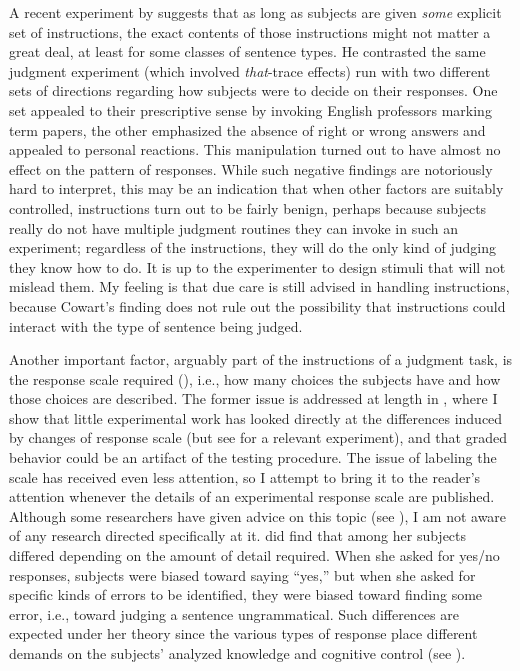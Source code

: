 A recent experiment by \citep[55\textendash{}59]{Cowart1997}
suggests that as long as subjects are given \textit{some} explicit set of instructions, the exact contents of those instructions might not matter a great deal, at least for some classes of sentence types. He contrasted the same judgment experiment (which involved \textit{that}-trace effects) run with two different sets of directions regarding how subjects were to decide on their responses. One set appealed to their prescriptive sense by invoking English professors marking term papers, the other emphasized the absence of right or wrong answers and appealed to personal reactions. This manipulation turned out to have almost no effect on the pattern of responses. While such negative findings are notoriously hard to interpret, this may be an indication that when other factors are suitably controlled, instructions turn out to be fairly benign, perhaps because subjects really do not have multiple judgment routines they can invoke in such an experiment; regardless of the instructions, they will do the only kind of judging they know how to do. It is up to the experimenter to design stimuli that will not mislead them. My feeling is that due care is still advised in handling instructions, because Cowart's finding does not rule out the possibility that instructions could interact with the type of sentence being judged.

Another important factor, arguably part of the instructions of a judgment task, is the response scale required (\citealt{VanKleeck1982}), i.e., how many choices the subjects have and how those choices are described. The former issue is addressed
at length in , where I show that little experimental work has looked directly at the differences induced by changes of response scale (but see \citet[67\textendash{}77]{Cowart1997} for a relevant experiment), and that graded behavior could be an artifact of the testing procedure. The issue of labeling the scale has received even less attention, so I attempt to bring it to the reader's attention whenever the details of an experimental response scale are published. Although some researchers have given advice on this topic (see ), I am not aware of any research directed specifically at it. \citet{Bialystok1979} did find that  among her subjects differed depending on the amount of detail required. When she asked for yes/no responses, subjects were biased toward saying ``yes,'' but when she asked for specific kinds of errors to be identified, they were biased toward finding some error, i.e., toward judging a sentence ungrammatical. Such differences are expected under her theory since the various types of response place different demands on the subjects' analyzed knowledge and cognitive control (see ).

